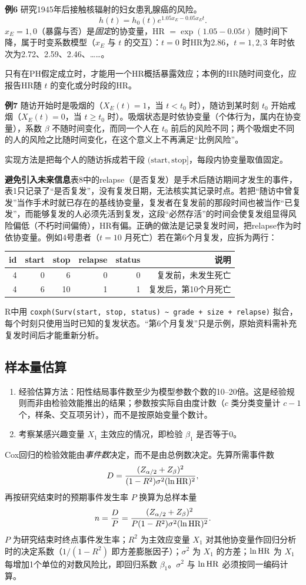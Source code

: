 \textbf{例6} 研究1945年后接触核辐射的妇女患乳腺癌的风险。
\[
h(t)=h_0(t)e^{1.05x_E-0.05x_Et}.
\]
$x_E=1,0$（暴露与否）是\emph{固定}的协变量，HR $=\exp(1.05-0.05t)$ 随时间下降，属于时变系数模型（$x_E$ 与 $t$ 的交互）：$t=0$ 时HR为2.86，$t=1,2,3$ 年时依次为2.72、2.59、2.46、……。
\begin{annotation}只有在PH假定成立时，才能用一个HR概括暴露效应；本例的HR随时间变化，应报告HR随 $t$ 的变化或分时段的HR。\end{annotation}
\textbf{例7} 随访开始时是吸烟的（$X_E(t)=1$，当 $t<t_0$ 时），随访到某时刻 $t_0$ 开始戒烟（$X_E(t)=0$，当 $t\ge t_0$ 时）。吸烟状态是时依协变量（个体行为，属内在协变量），系数 $\beta$ 不随时间变化，而同一个人在 $t_0$ 前后的风险不同；两个吸烟史不同的人的风险之比随时间变化，在这个意义上不再满足“比例风险”。
\begin{annotation}实现方法是把每个人的随访拆成若干段 $(\text{start},\text{stop}]$，每段内协变量取值固定。\end{annotation}
\textbf{避免引入未来信息}\quad 表8中的relapse（是否复发）是手术后随访期间才发生的事件，表1只记录了“是否复发”，没有复发日期，无法核实其记录时点。若把“随访中曾复发”当作手术时就已存在的基线协变量，复发者在复发前的那段时间也被当作“已复发”，而能够复发的人必须先活到复发，这段“必然存活”的时间会使复发组显得风险偏低（不朽时间偏倚），HR有偏。正确的做法是记录复发时间，把relapse作为时依协变量。例如4号患者（$t=10$ 月死亡）若在第6个月复发，应拆为两行：
\begin{center}\small\begin{tabular}{rrrrrr}\toprule id&start&stop&relapse&status&说明\\\midrule
4&0&6&0&0&复发前，未发生死亡\\
4&6&10&1&1&复发后，第10个月死亡\\\bottomrule\end{tabular}\end{center}
R中用 \texttt{coxph(Surv(start, stop, status) \textasciitilde{} grade + size + relapse)} 拟合，每个时刻只使用当时已知的复发状态。“第6个月复发”只是示例，原始资料需补充复发时间后才能重新分析。
\subsection{样本量估算}
\begin{enumerate}
\item 经验估算方法：阳性结局事件数至少为模型参数个数的10--20倍。这是经验规则而非由检验效能推出的结果；参数按实际自由度计数（$c$ 类分类变量计 $c-1$ 个，样条、交互项另计），而不是按原始变量个数计。
\item 考察某感兴趣变量 $X_1$ 主效应的情况，即检验 $\beta_1$ 是否等于0。
\end{enumerate}
Cox回归的检验效能由\emph{事件数}决定，而不是由总例数决定。先算所需事件数
\[
D=\frac{(Z_{\alpha/2}+Z_\beta)^2}{(1-R^2)\sigma^2(\ln\operatorname{HR})^2},
\]
再按研究结束时的预期事件发生率 $P$ 换算为总样本量
\[
n=\frac DP=\frac{(Z_{\alpha/2}+Z_\beta)^2}{P(1-R^2)\sigma^2(\ln\operatorname{HR})^2}.
\]
$P$ 为研究结束时终点事件发生率；$R^2$ 为主效应变量 $X_1$ 对其他协变量作回归分析时的决定系数（$1/(1-R^2)$ 即方差膨胀因子）；$\sigma^2$ 为 $X_1$ 的方差；$\ln\operatorname{HR}$ 为 $X_1$ 每增加1个单位的对数风险比，即回归系数 $\beta_1$。$\sigma^2$ 与 $\ln\operatorname{HR}$ 必须按同一编码计算。

